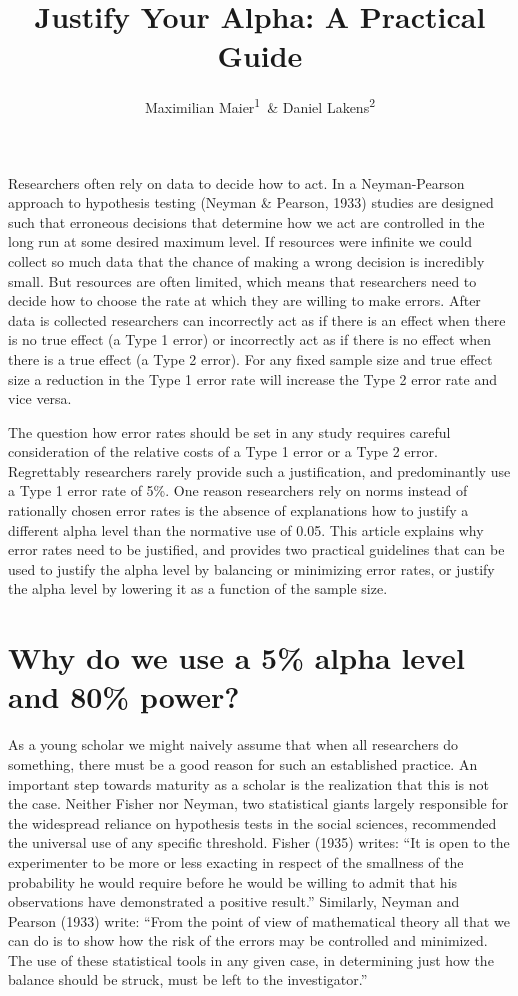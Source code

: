 \documentclass[
  english,
  ,man,floatsintext]{apa6}
\author{Maximilian Maier\textsuperscript{1}\ \& Daniel Lakens\textsuperscript{2}}
\affiliation{
\vspace{0.5cm}
\textsuperscript{1} University of Amsterdam, The Netherlands\\\textsuperscript{2} Eindhoven University of Technology, The Netherlands}
\title{Justify Your Alpha: A Practical Guide}
\date{}
\begin{document}
\maketitle

Researchers often rely on data to decide how to act. In a Neyman-Pearson approach to hypothesis testing (Neyman \& Pearson, 1933) studies are designed such that erroneous decisions that determine how we act are controlled in the long run at some desired maximum level. If resources were infinite we could collect so much data that the chance of making a wrong decision is incredibly small. But resources are often limited, which means that researchers need to decide how to choose the rate at which they are willing to make errors. After data is collected researchers can incorrectly act as if there is an effect when there is no true effect (a Type 1 error) or incorrectly act as if there is no effect when there is a true effect (a Type 2 error). For any fixed sample size and true effect size a reduction in the Type 1 error rate will increase the Type 2 error rate and vice versa.

The question how error rates should be set in any study requires careful consideration of the relative costs of a Type 1 error or a Type 2 error. Regrettably researchers rarely provide such a justification, and predominantly use a Type 1 error rate of 5\%. One reason researchers rely on norms instead of rationally chosen error rates is the absence of explanations how to justify a different alpha level than the normative use of 0.05. This article explains why error rates need to be justified, and provides two practical guidelines that can be used to justify the alpha level by balancing or minimizing error rates, or justify the alpha level by lowering it as a function of the sample size.

\hypertarget{why-do-we-use-a-5-alpha-level-and-80-power}{%
\section{Why do we use a 5\% alpha level and 80\% power?}\label{why-do-we-use-a-5-alpha-level-and-80-power}}

As a young scholar we might naively assume that when all researchers do something, there must be a good reason for such an established practice. An important step towards maturity as a scholar is the realization that this is not the case. Neither Fisher nor Neyman, two statistical giants largely responsible for the widespread reliance on hypothesis tests in the social sciences, recommended the universal use of any specific threshold. Fisher (1935) writes: ``It is open to the experimenter to be more or less exacting in respect of the smallness of the probability he would require before he would be willing to admit that his observations have demonstrated a positive result.'' Similarly, Neyman and Pearson (1933) write: ``From the point of view of mathematical theory all that we can do is to show how the risk of the errors may be controlled and minimized. The use of these statistical tools in any given case, in determining just how the balance should be struck, must be left to the investigator.''
\end{document}
